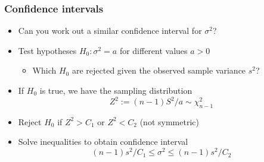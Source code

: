 \documentclass[t]{beamer} %
\begin{document}
\begin{frame}
  \frametitle{Confidence intervals}

  \begin{itemize}
  \item Can you work out a similar confidence interval for $\sigma^2$?
  \item Test hypotheses $H_0: \sigma^2 = a$ for different values $a > 0$
    \begin{itemize}
    \item[\hand] Which $H_0$ are rejected given the observed sample variance $s^2$?
    \end{itemize}
  \item If $H_0$ is true, we have the sampling distribution
    \[
    Z^2 := (n-1) S^2 / a \sim \chi^2_{n-1}
    \]
  \item Reject $H_0$ if $Z^2 > C_1$  or $Z^2 < C_2$ (not symmetric)
  \item Solve inequalities to obtain confidence interval
    \[
    (n-1) s^2 / C_1 \leq \sigma^2 \leq (n-1) s^2 / C_2
    \]
  \end{itemize}
\end{frame}
\end{document}
